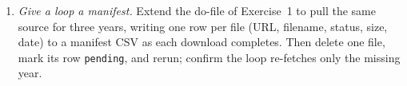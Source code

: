 \begin{enumerate}
    \texttt{rename price price\_usd}, \texttt{cars\_2020.csv} into a
    \texttt{raw/} folder. Write a one-row map CSV
    (\texttt{price\_usd,price,2020,}) outside that folder, run
    \texttt{combineall using "built/cars\_panel", cmethod(append)
    directory("raw/") map("map.csv")}, then \texttt{use} the result
    and confirm from the harmonization table and
    \texttt{char list price[source]} that the two years stacked into
    a single \texttt{price} column that records its 2020 provenance.
  \item \emph{Give a loop a manifest.} Extend the do-file of
    Exercise~1 to pull the same source for three years, writing one
    row per file (URL, filename, status, size, date) to a manifest
    CSV as each download completes. Then delete one file, mark its
    row \texttt{pending}, and rerun; confirm the loop re-fetches
    only the missing year.
\end{enumerate}

